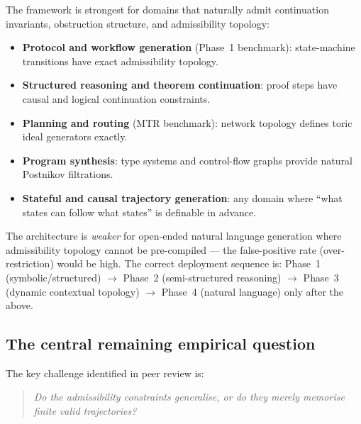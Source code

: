 \documentclass[11pt,a4paper]{article}
\begin{document}
The framework is strongest for domains that naturally admit
continuation invariants, obstruction structure, and admissibility
topology:
\begin{itemize}
  \item \textbf{Protocol and workflow generation} (Phase~1 benchmark):
        state-machine transitions have exact admissibility topology.
  \item \textbf{Structured reasoning and theorem continuation}:
        proof steps have causal and logical continuation constraints.
  \item \textbf{Planning and routing} (MTR benchmark):
        network topology defines toric ideal generators exactly.
  \item \textbf{Program synthesis}: type systems and control-flow
        graphs provide natural Postnikov filtrations.
  \item \textbf{Stateful and causal trajectory generation}:
        any domain where ``what states can follow what states'' is
        definable in advance.
\end{itemize}
The architecture is \emph{weaker} for open-ended natural language
generation where admissibility topology cannot be pre-compiled ---
the false-positive rate (over-restriction) would be high.
The correct deployment sequence is:
Phase~1 (symbolic/structured) $\to$
Phase~2 (semi-structured reasoning) $\to$
Phase~3 (dynamic contextual topology) $\to$
Phase~4 (natural language) only after the above.

\subsection{The central remaining empirical question}

The key challenge identified in peer review is:

\begin{quote}
\emph{Do the admissibility constraints generalise, or do they
merely memorise finite valid trajectories?}
\end{quote}
\end{document}
